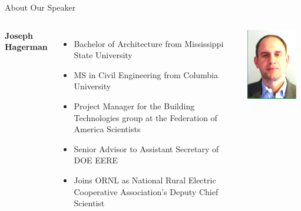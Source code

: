 \documentclass[handout]{beamer}
\begin{document}
\begin{frame}{About Our Speaker}
\begin{columns}
    \textbf{Joseph Hagerman}
    \begin{itemize}
        \item Bachelor of Architecture from Mississippi State University
        \item MS in Civil Engineering from Columbia University
        \item Project Manager for the Building Technologies group at
            the Federation of America Scientists
        \item Senior Advisor to Assistant Secretary of DOE EERE
        \item Joins ORNL as National Rural Electric Cooperative Association's
            Deputy Chief Scientist
    \end{itemize}
    \includegraphics[width=0.9\textwidth]{hagerman}
\end{columns}
\end{frame}
\end{document}
